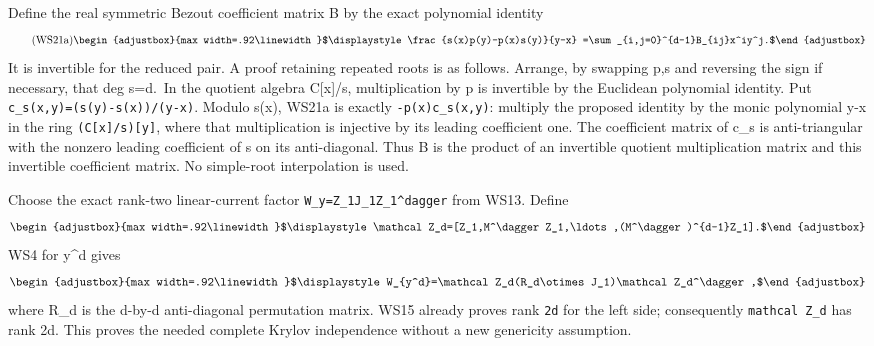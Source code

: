 \documentclass[11pt]{article}
\begin{document}
Define the real symmetric Bezout coefficient matrix B by the exact polynomial identity 
\begin{equation*}
\tag{WS21a}
\begin{adjustbox}{max width=.92\linewidth}$\displaystyle \frac{s(x)p(y)-p(x)s(y)}{y-x}
 =\sum_{i,j=0}^{d-1}B_{ij}x^iy^j.$\end{adjustbox}
\end{equation*}
 It is invertible for the reduced pair. A proof retaining repeated roots is as follows. Arrange, by swapping p,s and reversing the sign if necessary, that deg s=d.~In the quotient algebra C{[}x{]}/s, multiplication by p is invertible by the Euclidean polynomial identity. Put \texttt{c\_\allowbreak{}s(x,\allowbreak{}y)=\allowbreak{}(s(y)-s(x))/\allowbreak{}(y-x)}. Modulo s(x), WS21a is exactly \texttt{-p(x)c\_\allowbreak{}s(x,\allowbreak{}y)}: multiply the proposed identity by the monic polynomial y-x in the ring \texttt{(C{[}x{]}/\allowbreak{}s){[}y{]}}, where that multiplication is injective by its leading coefficient one. The coefficient matrix of c\_s is anti-triangular with the nonzero leading coefficient of s on its anti-diagonal. Thus B is the product of an invertible quotient multiplication matrix and this invertible coefficient matrix. No simple-root interpolation is used.

Choose the exact rank-two linear-current factor \texttt{W\_\allowbreak{}y=\allowbreak{}Z\_\allowbreak{}1J\_\allowbreak{}1Z\_\allowbreak{}1\^{}dagger} from WS13. Define 
\begin{equation*}
\begin{adjustbox}{max width=.92\linewidth}$\displaystyle \mathcal Z_d=[Z_1,M^\dagger Z_1,\ldots,(M^\dagger)^{d-1}Z_1].$\end{adjustbox}
\end{equation*}
 WS4 for y\^{}d gives 
\begin{equation*}
\begin{adjustbox}{max width=.92\linewidth}$\displaystyle W_{y^d}=\mathcal Z_d(R_d\otimes J_1)\mathcal Z_d^\dagger,$\end{adjustbox}
\end{equation*}
 where R\_d is the d-by-d anti-diagonal permutation matrix. WS15 already proves rank \texttt{2d} for the left side; consequently \texttt{mathcal Z\_\allowbreak{}d} has rank 2d. This proves the needed complete Krylov independence without a new genericity assumption.
\end{document}
